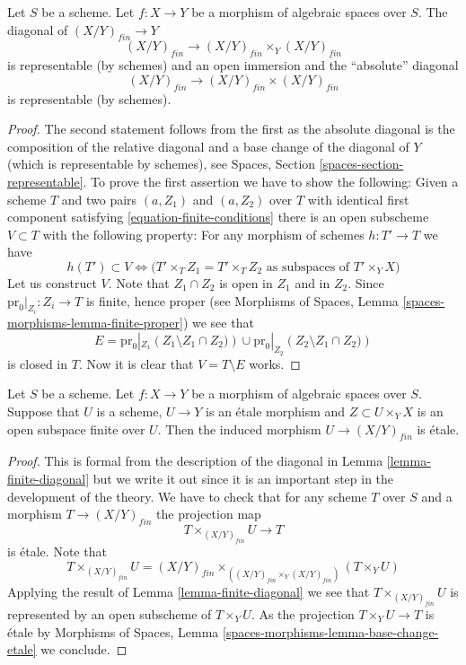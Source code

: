 \begin{lemma}
\label{lemma-finite-diagonal}
Let $S$ be a scheme.
Let $f : X \to Y$ be a morphism of algebraic spaces over $S$.
The diagonal of $(X/Y)_{fin} \to Y$
$$
(X/Y)_{fin} \longrightarrow (X/Y)_{fin} \times_Y (X/Y)_{fin}
$$
is representable (by schemes) and an open immersion and the ``absolute''
diagonal
$$
(X/Y)_{fin} \longrightarrow (X/Y)_{fin} \times (X/Y)_{fin}
$$
is representable (by schemes).
\end{lemma}

\begin{proof}
The second statement follows from the first as the absolute diagonal
is the composition of the relative diagonal and a base change
of the diagonal of $Y$ (which is representable by schemes), see
Spaces, Section \ref{spaces-section-representable}.
To prove the first assertion we have to show the following:
Given a scheme $T$ and two pairs $(a, Z_1)$ and $(a, Z_2)$ over $T$
with identical first component
satisfying \ref{equation-finite-conditions}
there is an open subscheme $V \subset T$ with the following
property: For any morphism of schemes $h : T' \to T$ we have
$$
h(T') \subset V \Leftrightarrow
\Big(T' \times_T Z_1 = T' \times_T Z_2
\text{ as subspaces of }T' \times_Y X\Big)
$$
Let us construct $V$. Note that $Z_1 \cap Z_2$ is open in $Z_1$
and in $Z_2$. Since $\text{pr}_0|_{Z_i} : Z_i \to T$ is finite,
hence proper (see
Morphisms of Spaces, Lemma \ref{spaces-morphisms-lemma-finite-proper})
we see that
$$
E =
\text{pr}_0|_{Z_1}\left(Z_1 \setminus Z_1 \cap Z_2)\right)
\cup
\text{pr}_0|_{Z_2}\left(Z_2 \setminus Z_1 \cap Z_2)\right)
$$
is closed in $T$. Now it is clear that $V = T \setminus E$ works.
\end{proof}

\begin{lemma}
\label{lemma-finite-criterion-etale}
Let $S$ be a scheme.
Let $f : X \to Y$ be a morphism of algebraic spaces over $S$.
Suppose that $U$ is a scheme, $U \to Y$ is an \'etale morphism and
$Z \subset U \times_Y X$ is an open subspace finite over $U$.
Then the induced morphism $U \to (X/Y)_{fin}$ is \'etale.
\end{lemma}

\begin{proof}
This is formal from the description of the diagonal in
Lemma \ref{lemma-finite-diagonal}
but we write it out since it is an important step in the development
of the theory. We have to check that for any scheme $T$ over $S$ and a morphism
$T \to (X/Y)_{fin}$ the projection map
$$
T \times_{(X/Y)_{fin}} U \longrightarrow T
$$
is \'etale. Note that
$$
T \times_{(X/Y)_{fin}} U
=
(X/Y)_{fin} \times_{((X/Y)_{fin} \times_Y (X/Y)_{fin})} (T \times_Y U)
$$
Applying the result of
Lemma \ref{lemma-finite-diagonal}
we see that $T \times_{(X/Y)_{fin}} U$ is represented by an open subscheme of
$T \times_Y U$. As the projection $T \times_Y U \to T$ is \'etale by
Morphisms of Spaces, Lemma \ref{spaces-morphisms-lemma-base-change-etale}
we conclude.
\end{proof}

